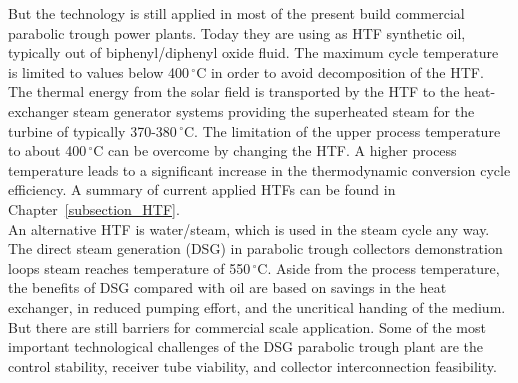 \documentclass[Master,MEE,english]{twbook}%
\begin{document}
But the technology is still applied in most of the present build commercial parabolic trough power plants. Today they are using as HTF synthetic oil, typically out of biphenyl/diphenyl oxide fluid. The maximum cycle temperature is limited to values below 400$\,^{\circ}\mathrm{C}$ in order to avoid decomposition of the HTF. The thermal energy from the solar field is transported by the HTF to the heat-exchanger steam generator systems providing the superheated steam for the turbine of typically 370-380$\,^{\circ}\mathrm{C}$. The limitation of the upper process temperature to about 400$\,^{\circ}\mathrm{C}$ can be overcome by changing the HTF. A higher process temperature leads to a significant increase in the thermodynamic conversion cycle efficiency. A summary of current applied HTFs can be found in Chapter~\ref{subsection_HTF}.\\
An alternative HTF is water/steam, which is used in the steam cycle any way. The direct steam generation (DSG) in parabolic trough collectors demonstration loops steam reaches temperature of 550$\,^{\circ}\mathrm{C}$. Aside from the process temperature, the benefits of DSG compared with oil are based on savings in the heat exchanger, in reduced pumping effort, and the uncritical handing of the medium. But there are still barriers for commercial scale application. Some of the most important technological challenges of the DSG parabolic trough plant are the control stability, receiver tube viability, and collector interconnection feasibility.  \cite{Alguacil2014}\\
\end{document}
